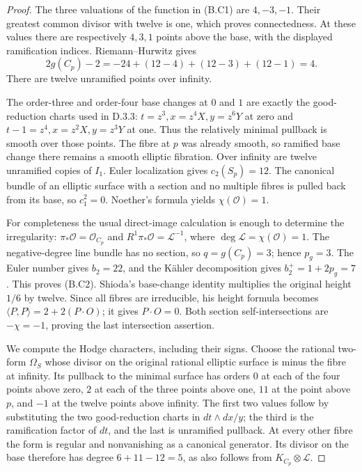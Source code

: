 \begin{proof}
The three valuations of the function in (B.C1) are $4,-3,-1$.
Their greatest common divisor with twelve is one, which proves
connectedness.  At these values there are respectively $4,3,1$
points above the base, with the displayed ramification indices.
Riemann--Hurwitz gives
\[
 2g(C_p)-2=-24+(12-4)+(12-3)+(12-1)=4.
\]
There are twelve unramified points over infinity.

The order-three and order-four base changes at $0$ and $1$
are exactly the good-reduction charts used in D.3.3:
$t=z^3,x=z^4X,y=z^6Y$ at zero and
$t-1=z^4,x=z^2X,y=z^3Y$ at one.  Thus the relatively
minimal pullback is smooth over those points.  The fibre at
$p$ was already smooth, so ramified base change there remains
a smooth elliptic fibration.  Over infinity are twelve
unramified copies of $I_1$.  Euler localization gives
$c_2(S_p)=12$.  The canonical bundle of an elliptic surface
with a section and no multiple fibres is pulled back from
its base, so $c_1^2=0$.  Noether's formula yields
$\chi(\mathcal O)=1$.

For completeness the usual direct-image calculation is enough
to determine the irregularity: $\pi_*\mathcal O=\mathcal O_{C_p}$
and $R^1\pi_*\mathcal O=\mathcal L^{-1}$, where
$\deg\mathcal L=\chi(\mathcal O)=1$.  The negative-degree
line bundle has no section, so $q=g(C_p)=3$; hence $p_g=3$.
The Euler number gives $b_2=22$, and the K\"ahler decomposition
gives $b_2^+=1+2p_g=7$.  This proves (B.C2).
Shioda's base-change identity
\cite[Proposition 8.12]{mapsShioda90} multiplies the original
height $1/6$ by twelve.  Since all fibres are irreducible,
his height formula \cite[Theorem 8.6]{mapsShioda90} becomes
$\langle P,P\rangle=2+2(P\cdot O)$; it gives $P\cdot O=0$.
Both section self-intersections are $-\chi=-1$, proving the
last intersection assertion.

We compute the Hodge characters, including their signs.
Choose the rational two-form $\Omega_S$ whose divisor on the
original rational elliptic surface is minus the fibre at infinity.
Its pullback to the minimal surface has orders $0$ at each of the
four points above zero, $2$ at each of the three points above one,
$11$ at the point above $p$, and $-1$ at the twelve points above
infinity.  The first two values follow by substituting the two
good-reduction charts in $dt\wedge dx/y$; the third is the
ramification factor of $dt$, and the last is unramified pullback.
At every other fibre the form is regular and nonvanishing as
a canonical generator.  Its divisor on the base therefore has
degree $6+11-12=5$, as also follows from $K_{C_p}\otimes\mathcal L$.


\end{proof}
